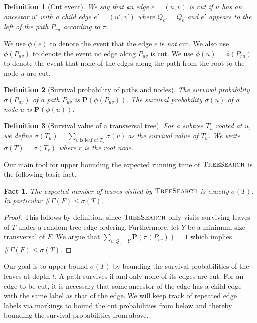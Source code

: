\documentclass[10pt,a4paper]{article}
\newtheorem{fact}{Fact}
\newtheorem{definition}{Definition}
\newcommand{\prob}{\mathbf{P}}
\newcommand{\ntrn}{\#\Gamma}
\newcommand{\total}{\sigma}
\newcommand{\cutp}{\phi}
\newcommand{\ts}{\textsc{TreeSearch}}
\begin{document}
\begin{definition}[Cut event]
We say that an edge $e=(u,v)$ is \emph{cut} if  
$u$ has an ancestor $u'$ with a child edge $e'= (u',v')$
where $Q_{e'}=Q_e$ and 
$e'$ appears to the left of the path $P_{ru}$ according to $\pi$.
\end{definition}


We use $\cutp(e)$ to denote the event that the edge $e$ is \emph{not} cut.
We also use $\cutp(P_{uv})$ to denote the event no edge along $P_{uv}$ is cut.
We use $\cutp(u)=\cutp(P_{ru})$ to denote the event that none of the edges along the path from the root to the node $u$ are cut. 

\begin{definition}[Survival probability of paths and nodes]
The survival probability $\sigma(P_{uv})$
of a path $P_{uv}$ is $\prob(\cutp(P_{uv}))$.
The \emph{survival probability} $\sigma(u)$ of a node $u$ is $\prob(\cutp(u))$.
\end{definition}


\begin{definition}[Survival value of a transversal tree]
For a subtree $T_u$ rooted at $u$,
we define
$\total(T_u) = \sum_{\text{$v$ is leaf of $T_u$}} \sigma(v)$
as the survival value of $T_u$. We write $\total(T) = \total(T_r)$ where 
$r$ is the root node.
\end{definition}

Our main tool for upper bounding the expected running time of $\ts$ is the following basic fact.

\begin{fact}
\label{fact:ntrans-tree}
The expected number of leaves visited by $\ts$ is exactly $\total(T)$. In particular $\ntrn(F) \leq  \total(T)$.
\end{fact}

\begin{proof}
This follows by definition, since $\ts$ only visits surviving leaves of $T$ under a random tree-edge ordering. Furthermore, let $Y$ be  a minimum-size transversal of $F$.
We argue that $\sum_{v:Q_v=Y }\prob(\pi(P_{rv})) = 1$ which implies 
$\ntrn(F) \leq  \total(T)$.
\end{proof}

Our goal is to upper bound $\total(T)$ by bounding 
the survival probabilities of the leaves at depth $t$. 
A path survives if and only none of its edges are cut.
For an edge to be cut, it is necessary that some ancestor of the edge 
has a child edge with the same label as that of the edge. 
We will keep track of repeated edge labels via markings to bound 
the cut probabilities from below and thereby bounding the survival probabilities
from above.
\end{document}
